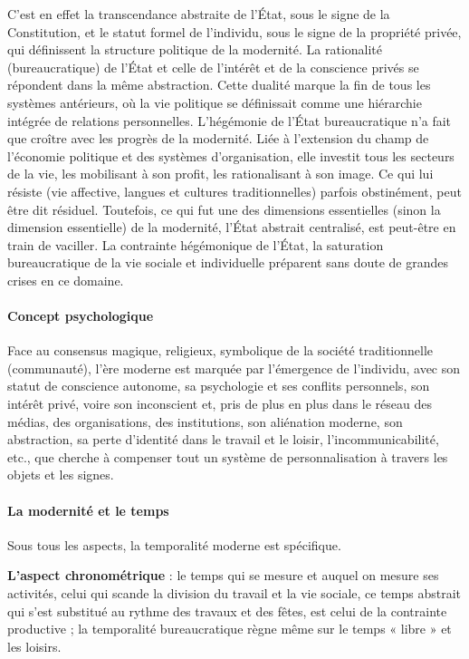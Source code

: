 C'est en effet la transcendance abstraite de l'État, sous le signe de la Constitution, et le statut formel de l'individu, sous le signe de la propriété privée, qui définissent la structure politique de la modernité. La rationalité (bureaucratique) de l'État et celle de l'intérêt et de la conscience privés se répondent dans la même abstraction. Cette dualité marque la fin de tous les systèmes antérieurs, où la vie politique se définissait comme une hiérarchie intégrée de relations personnelles. L'hégémonie de l'État bureaucratique n'a fait que croître avec les progrès de la modernité. Liée à l'extension du champ de l'économie politique et des systèmes d'organisation, elle investit tous les secteurs de la vie, les mobilisant à son profit, les rationalisant à son image. Ce qui lui résiste (vie affective, langues et cultures traditionnelles) parfois obstinément, peut être dit résiduel. Toutefois, ce qui fut une des dimensions essentielles (sinon la dimension essentielle) de la modernité, l'État abstrait centralisé, est peut-être en train de vaciller. La contrainte hégémonique de l'État, la saturation bureaucratique de la vie sociale et individuelle préparent sans doute de grandes crises en ce domaine.
\paragraph{Concept psychologique}
Face au consensus magique, religieux, symbolique de la société traditionnelle (communauté), l'ère moderne est marquée par l'émergence de l'individu, avec son statut de conscience autonome, sa psychologie et ses conflits personnels, son intérêt privé, voire son inconscient et, pris de plus en plus dans le réseau des médias, des organisations, des institutions, son aliénation moderne, son abstraction, sa perte d'identité dans le travail et le loisir, l'incommunicabilité, etc., que cherche à compenser tout un système de personnalisation à travers les objets et les signes.
\paragraph{La modernité et le temps}
Sous tous les aspects, la temporalité moderne est spécifique.

\textbf{L'aspect chronométrique }: le temps qui se mesure et auquel on mesure ses activités, celui qui scande la division du travail et la vie sociale, ce temps abstrait qui s'est substitué au rythme des travaux et des fêtes, est celui de la contrainte productive ; la temporalité bureaucratique règne même sur le temps « libre » et les loisirs.
 
